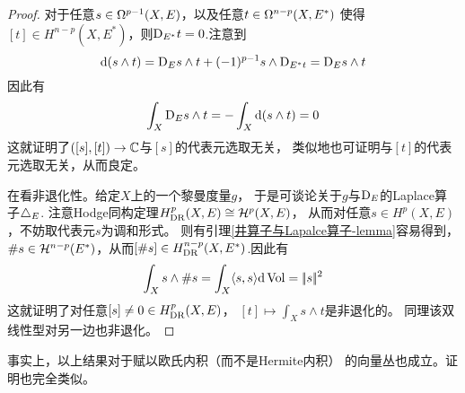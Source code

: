 \begin{proof}
对于任意$s\in\Omega^{p-1}(X,E)$，以及任意$t\in\Omega^{n-p}(X,E^*)$
使得$[t]\in H^{n-p}(X,E^*)$，则$\mathrm{D}_{E^*}t=0$.注意到
$$
  \mathrm{d}(s\wedge t)
=
  \mathrm{D}_Es\wedge t+(-1)^{p-1}s\wedge\mathrm{D}_{E^*t}
=
  \mathrm{D}_Es\wedge t
$$
因此有
$$
  \int_X\mathrm{D}_Es\wedge t=-\int_X\mathrm{d}(s\wedge t)=0
$$
这就证明了$([s],[t])\to\mathbb{C}$与$[s]$的代表元选取无关，
类似地也可证明与$[t]$的代表元选取无关，从而良定。

在看非退化性。给定$X$上的一个黎曼度量$g$，
于是可谈论关于$g$与$\mathrm{D}_E$的Laplace算子$\triangle_E$.
注意Hodge同构定理$H^p_{\operatorname{DR}}(X,E)\cong\mathcal{H}^p(X,E)$，
从而对任意$s\in H^p(X,E)$，不妨取代表元$s$为调和形式。
则有引理\ref{井算子与Lapalce算子-lemma}容易得到，
$\#s\in\mathcal{H}^{n-p}(E^*)$，从而$[\#s]\in H^{n-p}_{\operatorname{DR}}(X,E^*)$.因此有
$$
  \int_Xs\wedge\#s
=
  \int_X\langle s,s \rangle\mathrm{d}\operatorname{Vol}
=
  |\!|s|\!|^2
$$
这就证明了对任意$[s]\neq 0\in H^p_{\operatorname{DR}}(X,E)$，
$[t]\mapsto\int_Xs\wedge t$是非退化的。
同理该双线性型对另一边也非退化。
\end{proof}

\begin{rem}
事实上，以上结果对于赋以欧氏内积（而不是Hermite内积）
的向量丛也成立。证明也完全类似。
\end{rem}

